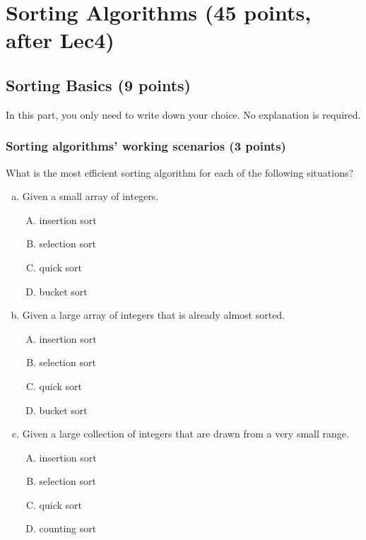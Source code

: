 \documentclass[11pt]{exam}
\begin{document}
\section{Sorting Algorithms (45 points, after Lec4)}

\subsection{Sorting Basics (9 points)}
{In this part, you only need to write down your choice. No explanation is required. }
\subsubsection{Sorting algorithms' working scenarios (3 points)}

What is the most efficient sorting algorithm for each of the following situations?
\begin{enumerate}[(a)]
    \item Given a small array of integers.
    \begin{enumerate}[A)]
        \item insertion sort
        \item selection sort
        \item quick sort
        \item bucket sort
    \end{enumerate}
    \begin{solution}
    \end{solution}

    \item Given a large array of integers that is already almost sorted.
    \begin{enumerate}[A)]
        \item insertion sort
        \item selection sort
        \item quick sort
        \item bucket sort
    \end{enumerate}
    \begin{solution}
    \end{solution}

    \item Given a large collection of integers that are drawn from a very small range.
    \begin{enumerate}[A)]
        \item insertion sort
        \item selection sort
        \item quick sort
        \item counting sort
    \end{enumerate}
    \begin{solution}
    \end{solution}

\end{enumerate}
\end{document}
